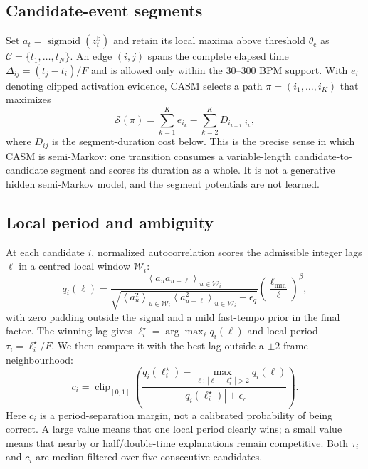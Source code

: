 \documentclass{article}
\begin{document}
\subsection{Candidate-event segments}
Set $a_t=\operatorname{sigmoid}(z_t^{\mathrm b})$ and retain its local maxima
above threshold $\theta_{\mathrm c}$ as
$\mathcal C=\{t_1,\ldots,t_N\}$. An edge $(i,j)$ spans the complete elapsed
time $\Delta_{ij}=(t_j-t_i)/F$ and is allowed only within the 30--300 BPM
support. With $e_i$ denoting clipped activation evidence, CASM selects a path
$\pi=(i_1,\ldots,i_K)$ that maximizes
\begin{equation}
\mathcal S(\pi)=\sum_{k=1}^{K}e_{i_k}
-\sum_{k=2}^{K}D_{i_{k-1},i_k},
\label{eq:casm-objective}
\end{equation}
where $D_{ij}$ is the segment-duration cost below. This is the precise sense in
which CASM is semi-Markov: one transition consumes a variable-length
candidate-to-candidate segment and scores its duration as a whole. It is not a
generative hidden semi-Markov model, and the segment potentials are not learned.

\subsection{Local period and ambiguity}

At each candidate $i$, normalized autocorrelation scores the admissible integer
lags $\ell$ in a centred local window $\mathcal W_i$:
\begin{equation}
q_i(\ell)=
\frac{\left\langle a_u a_{u-\ell}\right\rangle_{u\in\mathcal W_i}}
{\sqrt{\left\langle a_u^2\right\rangle_{u\in\mathcal W_i}
       \left\langle a_{u-\ell}^2\right\rangle_{u\in\mathcal W_i}
       +\epsilon_q}}
\left(\frac{\ell_{\min}}{\ell}\right)^{\beta},
\label{eq:casm-local-period}
\end{equation}
with zero padding outside the signal and a mild fast-tempo prior in the final
factor. The winning lag gives $\ell_i^\star=\arg\max_\ell q_i(\ell)$ and local
period $\tau_i=\ell_i^\star/F$. We then compare it with the best lag outside a
$\pm2$-frame neighbourhood:
\begin{equation}
c_i=\operatorname{clip}_{[0,1]}\!\left(
\frac{q_i(\ell_i^\star)-
\max_{\ell:\,|\ell-\ell_i^\star|>2}q_i(\ell)}
{|q_i(\ell_i^\star)|+\epsilon_c}\right).
\label{eq:casm-reliability}
\end{equation}
Here $c_i$ is a period-separation margin, not a calibrated probability of being
correct. A large value means that one local period clearly wins; a small value
means that nearby or half/double-time explanations remain competitive. Both
$\tau_i$ and $c_i$ are median-filtered over five consecutive candidates.
\end{document}
